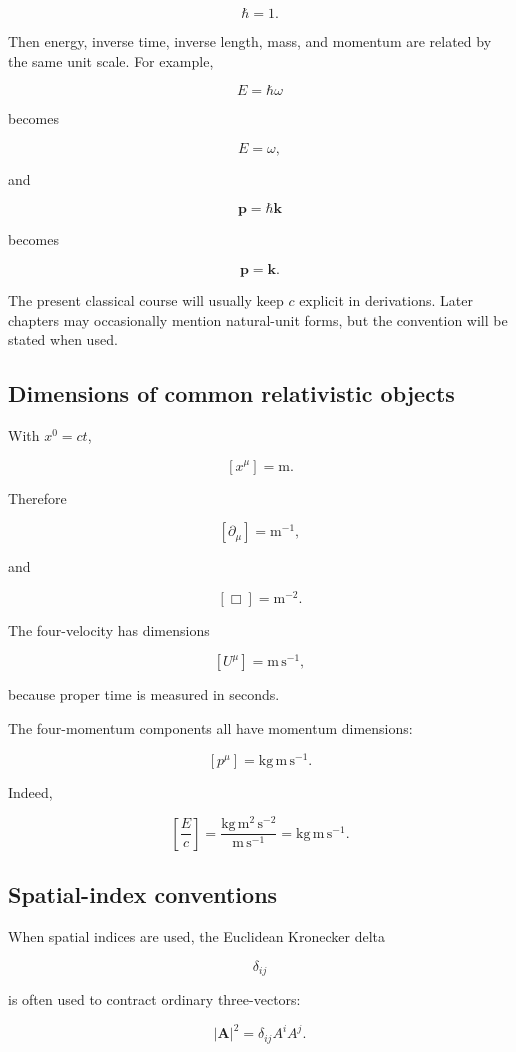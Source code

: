 \[
\hbar=1.
\]

Then energy, inverse time, inverse length, mass, and momentum are related by the same unit scale. For example,

\[
E=\hbar\omega
\]

becomes

\[
E=\omega,
\]

and

\[
\mathbf{p}=\hbar\mathbf{k}
\]

becomes

\[
\mathbf{p}=\mathbf{k}.
\]

The present classical course will usually keep \(c\) explicit in derivations. Later chapters may occasionally mention natural-unit forms, but the convention will be stated when used.

\subsection{Dimensions of common relativistic objects}

With \(x^{0}=ct\),

\[
[x^{\mu}]=\mathrm{m}.
\]

Therefore

\[
[\partial_{\mu}]=\mathrm{m}^{-1},
\]

and

\[
[\Box]=\mathrm{m}^{-2}.
\]

The four-velocity has dimensions

\[
[U^{\mu}]=\mathrm{m\,s^{-1}},
\]

because proper time is measured in seconds.

The four-momentum components all have momentum dimensions:

\[
[p^{\mu}]=\mathrm{kg\,m\,s^{-1}}.
\]

Indeed,

\[
\left[\frac{E}{c}\right]
=
\frac{\mathrm{kg\,m^{2}\,s^{-2}}}
{\mathrm{m\,s^{-1}}}
=
\mathrm{kg\,m\,s^{-1}}.
\]

\subsection{Spatial-index conventions}

When spatial indices are used, the Euclidean Kronecker delta

\[
\delta_{ij}
\]

is often used to contract ordinary three-vectors:

\[
|\mathbf{A}|^{2}
=
\delta_{ij}A^{i}A^{j}.
\]

